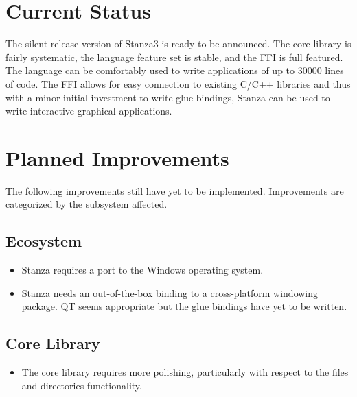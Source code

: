 \documentclass[fleqn, 12pt]{article}
\begin{document}
\maketitle

\section{Current Status}

The silent release version of Stanza3 is ready to be announced. The core library is fairly systematic, the language feature set is stable, and the FFI is full featured. The language can be comfortably used to write applications of up to 30000 lines of code. The FFI allows for easy connection to existing C/C++ libraries and thus with a minor initial investment to write glue bindings, Stanza can be used to write interactive graphical applications. 

\section{Planned Improvements}

The following improvements still have yet to be implemented. Improvements are categorized by the subsystem affected.

\subsection*{Ecosystem}
\begin{itemize}
\item Stanza requires a port to the Windows operating system.
\item Stanza needs an out-of-the-box binding to a cross-platform windowing package. QT seems appropriate but the glue bindings have yet to be written.
\end{itemize}

\subsection*{Core Library}
\begin{itemize}
\item The core library requires more polishing, particularly with respect to the files and directories functionality.

\end{itemize}
\end{document}
